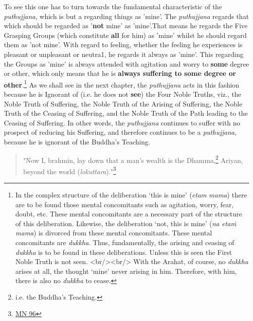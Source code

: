 To see this one has to turn towards the fundamental characteristic of
the \emph{puthujjana}, which is but a regarding things as 'mine'. The
\emph{puthujjana} regards that which should be regarded as '\textbf{not} mine' as
'mine'.That means he regards the Five Grasping Groups (which constitute
\textbf{all} for him) as 'mine' whilst he should regard them as 'not mine'.
With regard to feeling, whether the feeling he experiences is pleasant
or unpleasant or neutra1, he regards it always as 'mine'. This regarding
the Groups as 'mine' is always attended with agitation and worry to
\textbf{some} degree or other, which only means that he is \textbf{always suffering
to some degree or other}.\footnote{In the complex structure of the deliberation `this is mine' (\emph{etam mama}) there are to be found those mental concomitants such as agitation, worry, fear, doubt, etc. These mental concomitants are a necessary part of the structure of this deliberation. Likewise, the deliberation `not, this is mine' (\emph{na etaṁ mama}) is divorced from these mental concomitants. These mental concomitants are \emph{dukkha}. Thus, fundamentally, the arising and ceasing of \emph{dukkha} is to be found in these deliberations. Unless this is seen the First Noble Truth is not seen. <br/><br/> With the Arahat, of course, no \emph{dukkha} arises at all, the thought `mine' never arising in him. Therefore, with him, there is also no \emph{dukkha} to cease.}
As we shall see in the next chapter, the \emph{puthujjana} acts in this fashion because he is
Ignorant of (i.e. he does not \textbf{see}) the Four Noble Truths, viz., the
Noble Truth of Suffering, the Noble Truth of the Arising of Suffering,
the Noble Truth of the Ceasing of Suffering, and the Noble Truth of the
Path leading to the Ceasing of Suffering. In other words, the
\emph{puthujjana} continues to suffer with no prospect of reducing his
Suffering, and therefore continues to be a \emph{puthujjana}, because he is
ignorant of the Buddha’s Teaching.


\begin{quotation}
"Now I, brahmin, lay down that a man’s wealth is the Dhamma,\footnote{i.e. the Buddha’s Teaching.}
Ariyan, beyond the world (\emph{lokuttara})."\footnote{\href{https://suttacentral.net/mn96/en/sujato}{MN 96}}


\end{quotation}

